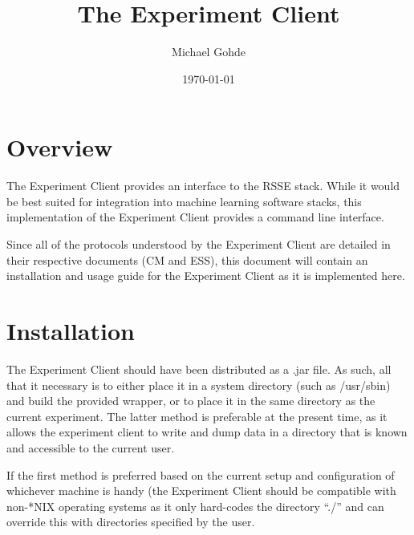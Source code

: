 \documentclass[letterpaper]{article}
\begin{document}
\title{The Experiment Client}
\author{Michael Gohde}
\date{\today}
\maketitle

\section{Overview}
The Experiment Client provides an interface to the RSSE stack. While it would be best suited for integration into machine learning software stacks, this implementation of the Experiment Client provides a command line interface. 

Since all of the protocols understood by the Experiment Client are detailed in their respective documents (CM and ESS), this document will contain an installation and usage guide for the Experiment Client as it is implemented here.

\section{Installation}
The Experiment Client should have been distributed as a .jar file. As such, all that it necessary is to either place it in a system directory (such as /usr/sbin) and build the provided wrapper, or to place it in the same directory as the current experiment. The latter method is preferable at the present time, as it allows the experiment client to write and dump data in a directory that is known and accessible to the current user. 

If the first method is preferred based on the current setup and configuration of whichever machine is handy (the Experiment Client should be compatible with non-*NIX operating systems as it only hard-codes the directory ``./'' and can override this with directories specified by the user.
\end{document}
